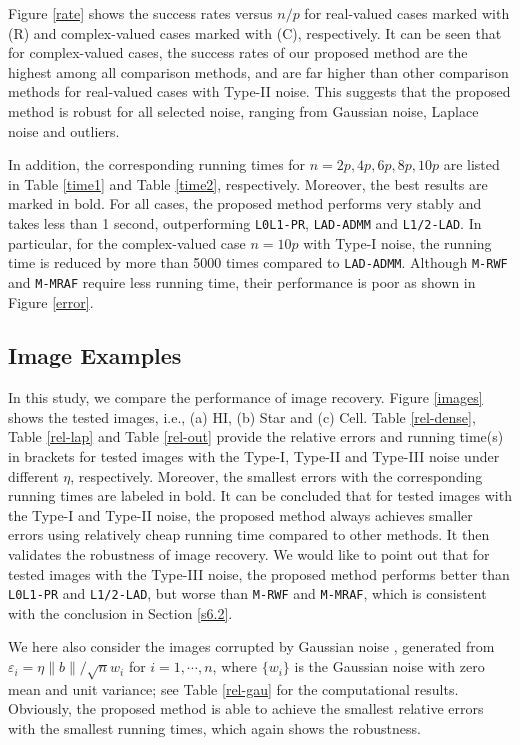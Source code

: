 \documentclass{article}
\numberwithin{equation}{section}
\begin{document}
Figure \ref{rate} shows the success rates versus $ n/p$ for real-valued cases marked with (R) and complex-valued cases marked with (C), respectively. 
It can be seen  that for complex-valued cases, the success rates of our proposed method are the highest among all comparison methods, and are far higher than other comparison methods for real-valued cases with Type-II noise. 
This suggests that the proposed method is robust for all selected noise, ranging from Gaussian noise, Laplace noise and outliers.


In addition, the corresponding running times for $n=2p, 4p, 6p, 8p, 10p$ are listed in Table \ref{time1} and Table \ref{time2}, respectively. Moreover, the best results are marked in bold.
For all cases, the proposed method performs very stably and takes less than 1 second, outperforming \verb"L0L1-PR", \verb"LAD-ADMM" and \verb"L1/2-LAD". 
In particular, for the complex-valued case $n=10p$ with Type-I noise, the running time is reduced by more than 5000 times compared to \verb"LAD-ADMM".
Although \verb"M-RWF" and \verb"M-MRAF" require less running time, their performance is poor as shown in Figure \ref{error}. 




\subsection{Image Examples}

In this study, we compare the performance of image recovery. Figure \ref{images} shows the tested images, i.e., (a) HI, (b) Star and (c) Cell. Table \ref{rel-dense}, Table \ref{rel-lap} and Table \ref{rel-out} provide the relative errors and running time(s) in brackets for tested images with the Type-I, Type-II and Type-III noise under different $\eta$, respectively. Moreover, the smallest errors with the corresponding running times are labeled in bold. It can be concluded that for tested images with the Type-I and Type-II noise, the proposed method always achieves smaller errors using relatively cheap running time compared to other methods. It then validates the robustness of image recovery.
We would like to point out that for tested images with the Type-III noise, the proposed method performs better than \verb"L0L1-PR" and \verb"L1/2-LAD", but worse than \verb"M-RWF" and \verb"M-MRAF", which is consistent with the conclusion in Section \ref{s6.2}.

We here also consider the images corrupted by Gaussian noise \cite{weller15}, generated from $\varepsilon_i=\eta \|b\|/\sqrt{n} w_i$ for $i=1,\cdots,n$, where $\{w_i\}$ is the Gaussian noise with zero mean and unit variance; see Table \ref{rel-gau} for the computational results. Obviously, the proposed method is able to achieve the smallest relative errors with the smallest running times, which again shows the robustness.
\end{document}
